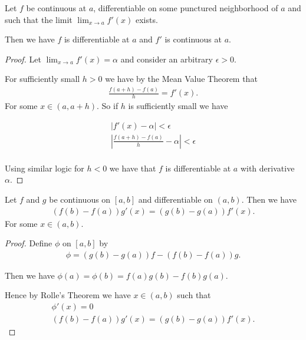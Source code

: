 \documentclass[]{article}
\begin{document}
\begin{thm}
		Let $f$ be continuous at $a$, differentiable on some punctured neighborhood of $a$ and such that the limit $\lim_{x\to a}f'(x)$ exists.

		Then we have $f $ is differentiable at $a$ and $f'$ is continuous at $a$.
\end{thm}

\begin{proof}
		Let $\lim_{x \to a} f'(x) = \alpha$ and consider an arbitrary $\epsilon > 0$. 

		For sufficiently small $h > 0$ we have by the Mean Value Theorem that 
		\begin{align*}
				\frac{f(a+h)-f(a)}{h} = f'(x).
		\end{align*}
		For some $x \in (a,a+h)$. So if $h$ is sufficiently small we have 

		\begin{align*}
			|f'(x) - \alpha| < \epsilon \\
			|\frac{f(a+h)-f(a)}{h} - \alpha| < \epsilon \\
		\end{align*}

		Using similar logic for $h < 0$ we have that $f$ is differentiable at $a$ with derivative $\alpha$.
\end{proof}

\begin{thm} 
		Let $f$ and $g$ be continuous on $[a,b]$ and differentiable on $(a,b)$. Then we have 
		\begin{align*}
				(f(b)-f(a))g'(x) = (g(b) - g(a))f'(x).
		\end{align*}
		For some $x \in (a,b)$.
\end{thm}

\begin{proof}
		Define $\phi$ on $[a,b]$ by 
		\begin{align*}
				\phi = (g(b) - g(a))f - (f(b) - f(a))g.
		\end{align*}

		Then we have $\phi(a) = \phi(b) = f(a)g(b) - f(b)g(a)$.

		Hence by Rolle's Theorem we have $x \in (a,b)$ such that 
		\begin{align*}
				\phi'(x) = 0 \\
				(f(b)-f(a))g'(x) = (g(b) - g(a))f'(x).
		\end{align*}
\end{proof}
\end{document}
